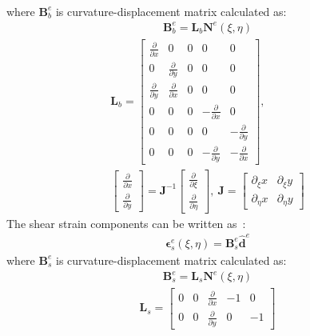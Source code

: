 \documentclass[materials,article,submit,moreauthors,pdftex]{Definitions/mdpi}
\begin{document}
{\begin{eqnarray}
\end{eqnarray}
where \(\textbf{B}_b^e\) is curvature-displacement matrix calculated as:
\begin{eqnarray}
\textbf{B}_b^e=\textbf{L}_b\textbf{N}^e(\xi,\eta)
\end{eqnarray}
\begin{eqnarray}
\textbf{L}_b=\left [
\begin{array}{ccccc}
\frac{\partial }{\partial x} & 0 & 0 & 0 & 0\\
0 & \frac{\partial }{\partial y} & 0 & 0 & 0\\
\frac{\partial }{\partial y} & \frac{\partial }{\partial x} & 0 & 0 & 0\\
0 & 0 & 0 & -\frac{\partial }{\partial x} & 0\\
0 & 0 & 0 & 0 & -\frac{\partial }{\partial y}\\
0 & 0 & 0 & -\frac{\partial }{\partial y} & -\frac{\partial }{\partial x}
\end{array} \right],\ \\
\left [
\begin{array}{c}
\frac{\partial }{\partial x}\\
\frac{\partial }{\partial y}
\end{array} \right] =\textbf{J}^{-1}
\left [
\begin{array}{c}
\frac{\partial }{\partial \xi}\\
\frac{\partial }{\partial \eta}
\end{array} \right], \ 
\textbf{J}=\left [
\begin{array}{cc}
\partial_\xi x & {\partial_\xi y} \\
\partial_\eta x & {\partial_\eta y}
\end{array} \right] \nonumber
\end{eqnarray}
The shear strain components can be written as~\cite{ferreira2008matlab}:
\begin{eqnarray}
\boldsymbol{\epsilon}_s^e(\xi,\eta)=\textbf{B}_s^e\widehat{\textbf{d}}^e
\end{eqnarray}
where \(\textbf{B}_s^e\) is curvature-displacement matrix calculated as:
\begin{eqnarray}
\textbf{B}_s^e=\textbf{L}_s\textbf{N}^e(\xi,\eta)
\end{eqnarray}
\begin{eqnarray}
\textbf{L}_s=\left [
\begin{array}{ccccc}
0 & 0 & \frac{\partial }{\partial x} & -1 & 0 \\
0 & 0 & \frac{\partial }{\partial y} & 0 & -1
\end{array} \right]
\end{eqnarray}
}
\end{document}
